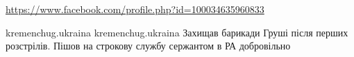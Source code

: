  
 
 
 
 

\url{https://www.facebook.com/profile.php?id=100034635960833}\par
kremenchug.ukraina
kremenchug.ukraina
Захищав барикади Груші після перших розстрілів. Пішов на строкову службу сержантом в РА добровільно

